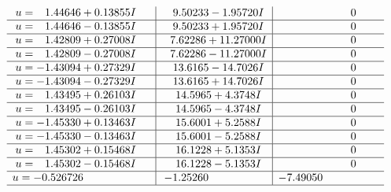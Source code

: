 \documentclass[1p]{elsarticle_modified}
\theoremstyle{definition}
\begin{document}
$$\begin{array}{c|c|c}
\begin{aligned}
u &= \phantom{-}1.44646 + 0.13855 I\end{aligned}
 & \phantom{-}9.50233 - 1.95720 I & \phantom{-0.000000 } 0 \\ \hline\begin{aligned}
u &= \phantom{-}1.44646 - 0.13855 I\end{aligned}
 & \phantom{-}9.50233 + 1.95720 I & \phantom{-0.000000 } 0 \\ \hline\begin{aligned}
u &= \phantom{-}1.42809 + 0.27008 I\end{aligned}
 & \phantom{-}7.62286 + 11.27000 I & \phantom{-0.000000 } 0 \\ \hline\begin{aligned}
u &= \phantom{-}1.42809 - 0.27008 I\end{aligned}
 & \phantom{-}7.62286 - 11.27000 I & \phantom{-0.000000 } 0 \\ \hline\begin{aligned}
u &= -1.43094 + 0.27329 I\end{aligned}
 & \phantom{-}13.6165 - 14.7026 I & \phantom{-0.000000 } 0 \\ \hline\begin{aligned}
u &= -1.43094 - 0.27329 I\end{aligned}
 & \phantom{-}13.6165 + 14.7026 I & \phantom{-0.000000 } 0 \\ \hline\begin{aligned}
u &= \phantom{-}1.43495 + 0.26103 I\end{aligned}
 & \phantom{-}14.5965 + 4.3748 I & \phantom{-0.000000 } 0 \\ \hline\begin{aligned}
u &= \phantom{-}1.43495 - 0.26103 I\end{aligned}
 & \phantom{-}14.5965 - 4.3748 I & \phantom{-0.000000 } 0 \\ \hline\begin{aligned}
u &= -1.45330 + 0.13463 I\end{aligned}
 & \phantom{-}15.6001 + 5.2588 I & \phantom{-0.000000 } 0 \\ \hline\begin{aligned}
u &= -1.45330 - 0.13463 I\end{aligned}
 & \phantom{-}15.6001 - 5.2588 I & \phantom{-0.000000 } 0 \\ \hline\begin{aligned}
u &= \phantom{-}1.45302 + 0.15468 I\end{aligned}
 & \phantom{-}16.1228 + 5.1353 I & \phantom{-0.000000 } 0 \\ \hline\begin{aligned}
u &= \phantom{-}1.45302 - 0.15468 I\end{aligned}
 & \phantom{-}16.1228 - 5.1353 I & \phantom{-0.000000 } 0 \\ \hline\begin{aligned}
u &= -0.526726\phantom{ +0.000000I}\end{aligned}
 & -1.25260\phantom{ +0.000000I} & -7.49050\phantom{ +0.000000I}\\
 \hline 
 \end{array}$$\newpage
\end{document}
